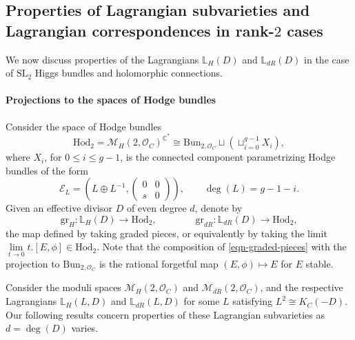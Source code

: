 \documentclass[twoside, 11pt]{article}
\numberwithin{equation}{section}
\theoremstyle{theorem}
\numberwithin{theorem}{section}
\theoremstyle{definition}
\begin{document}
\subsection{Properties of Lagrangian subvarieties and Lagrangian correspondences in rank-$2$ cases}
\label{sect-Lag-rk2}

We now discuss properties of the Lagrangians $\mathbb{L}_H(D)$ and $\mathbb{L}_{dR}(D)$ in the case of $\mathrm{SL}_2$ Higgs bundles and holomorphic connections.

\paragraph{Projections to the spaces of Hodge bundles}
Consider the space of Hodge bundles
\[ \mathrm{Hod}_2 = \mathcal{M}_H(2, \mathcal{O}_C)^{\mathbb{C}^\ast} \cong \mathrm{Bun}_{2, \mathcal{O}_C} \sqcup \left( \sqcup_{i=0}^{g-1} X_i \right), \]
where $X_i$, for $0 \leq i \leq g-1$, is the connected component parametrizing Hodge bundles of the form 
\[\mathcal{E}_L = \left( L \oplus L^{-1}, \left( \begin{smallmatrix} 0 & 0 \\ s & 0\end{smallmatrix}\right)\right), \qquad \deg(L) = g-1-i. \]  
Given an effective divisor $D$ of even degree $d$, denote by 
\begin{equation}\label{eqn-graded-pieces}
\mathrm{gr}_H: \mathbb{L}_H(D) \rightarrow \mathrm{Hod}_2, \qquad \qquad \mathrm{gr}_{dR}: \mathbb{L}_{dR}(D) \rightarrow \mathrm{Hod}_2, 
\end{equation}
the map defined by taking graded pieces, or equivalently by taking the limit $\underset{t \rightarrow 0}{\lim} t. [E, \phi] \in \mathrm{Hod}_2$.
Note that the composition of \eqref{eqn-graded-pieces} with the projection to $\mathrm{Bun}_{2, \mathcal{O}_C}$ is the rational forgetful map $(E, \phi) \mapsto E$ for $E$ stable.

Consider the moduli spaces $\mathcal{M}_H(2, \mathcal{O}_C)$ and $\mathcal{M}_{dR}(2, \mathcal{O}_C)$, and the respective Lagrangians $\mathbb{L}_H(L, D)$ and $\mathbb{L}_{dR}(L, D)$ for some $L$ satisfying $L^2 \cong K_C(-D)$. 
Our following results concern properties of these Lagrangian subvarieties as $d = \deg(D)$ varies.
\end{document}
